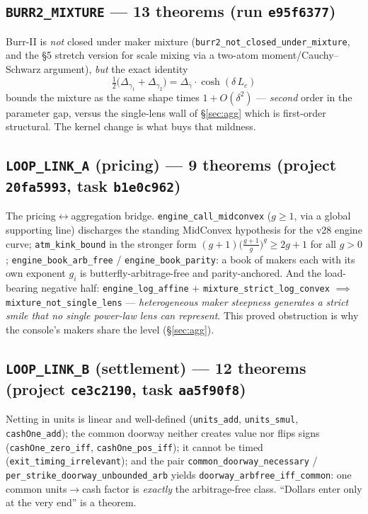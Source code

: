 \documentclass[11pt]{article}
\begin{document}
\subsection{\texttt{BURR2\_MIXTURE} --- 13 theorems (run \texttt{e95f6377})}
Burr-II is \emph{not} closed under maker mixture
(\texttt{burr2\_not\_closed\_under\_mixture}, and the \S5 stretch version for scale mixing via
a two-atom moment/Cauchy--Schwarz argument), \emph{but} the exact identity
\begin{equation}
\tfrac12\bigl(\Delta_{\gamma_1} + \Delta_{\gamma_2}\bigr)
= \Delta_{\bar\gamma}\cdot\cosh(\delta\,L_c)
\end{equation}
bounds the mixture as the same shape times $1+O(\delta^2)$ --- \emph{second} order in the
parameter gap, versus the single-lens wall of \S\ref{sec:agg} which is first-order structural.
The kernel change is what buys that mildness.

\subsection{\texttt{LOOP\_LINK\_A} (pricing) --- 9 theorems (project \texttt{20fa5993}, task \texttt{b1e0c962})}
The pricing$\leftrightarrow$aggregation bridge. \texttt{engine\_call\_midconvex} ($g\ge1$, via
a global supporting line) discharges the standing \textsf{MidConvex} hypothesis for the v28
engine curve; \texttt{atm\_kink\_bound} in the stronger form
$(g{+}1)\bigl(\tfrac{g+1}{g}\bigr)^{g} \ge 2g+1$ for all $g>0$;
\texttt{engine\_book\_arb\_free} / \texttt{engine\_book\_parity}: a book of makers each with
its own exponent $g_i$ is butterfly-arbitrage-free and parity-anchored. And the load-bearing
negative half: \texttt{engine\_log\_affine} $+$ \texttt{mixture\_strict\_log\_convex} $\implies$
\texttt{mixture\_not\_single\_lens} --- \emph{heterogeneous maker steepness generates a strict
smile that no single power-law lens can represent}. This proved obstruction is why the console's
makers share the level (\S\ref{sec:agg}).

\subsection{\texttt{LOOP\_LINK\_B} (settlement) --- 12 theorems (project \texttt{ce3c2190}, task \texttt{aa5f90f8})}
Netting in units is linear and well-defined (\texttt{units\_add}, \texttt{units\_smul},
\texttt{cashOne\_add}); the common doorway neither creates value nor flips signs
(\texttt{cashOne\_zero\_iff}, \texttt{cashOne\_pos\_iff}); it cannot be timed
(\texttt{exit\_timing\_irrelevant}); and the pair
\texttt{common\_doorway\_necessary} / \texttt{per\_strike\_doorway\_unbounded\_arb} yields
\texttt{doorway\_arbfree\_iff\_common}: one common units$\to$cash factor is \emph{exactly} the
arbitrage-free class. ``Dollars enter only at the very end'' is a theorem.
\end{document}
